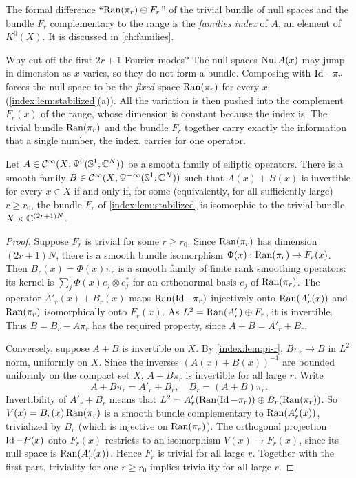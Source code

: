 The formal difference ``$\operatorname{Ran}(\pi_r)\ominus F_r$'' of the trivial bundle of
null spaces and the bundle $F_r$ complementary to the range is the
\emph{families index} of $A$, an element of $K^0(X)$. It is discussed in
\cref{ch:families}.

\begin{discussion}
  Why cut off the first $2r+1$ Fourier modes? The null spaces $\operatorname{Nul} A(x)$ may
  jump in dimension as $x$ varies, so they do not form a bundle. Composing with
  $\operatorname{Id}-\pi_r$ forces the null space to be the \emph{fixed} space $\operatorname{Ran}(\pi_r)$
  for every $x$ (\cref{index:lem:stabilized}(a)). All the variation is then
  pushed into the complement $F_r(x)$ of the range, whose dimension is constant
  because the index is. The trivial bundle $\operatorname{Ran}(\pi_r)$ and the bundle $F_r$
  together carry exactly the information that a single number, the index,
  carries for one operator.
\end{discussion}

\begin{theorem}\label{index:thm:perturb-family}
  Let $A\in\mathcal{C}^\infty(X;\Psi^{0}(\mathbb{S}^1;\mathbb{C}^N))$ be a smooth family of elliptic
  operators. There is a smooth family $B\in\mathcal{C}^\infty(X;\Psi^{-\infty}(\mathbb{S}^1;\mathbb{C}^N))$
  such that $A(x)+B(x)$ is invertible for every $x\in X$ if and only if, for
  some (equivalently, for all sufficiently large) $r\ge r_0$, the bundle
  $F_r$ of \cref{index:lem:stabilized} is isomorphic to the trivial bundle
  $X\times\mathbb{C}^{(2r+1)N}$.
\end{theorem}
\begin{proof}
  Suppose $F_r$ is trivial for some $r\ge r_0$. Since $\operatorname{Ran}(\pi_r)$ has
  dimension $(2r+1)N$, there is a smooth bundle isomorphism
  $\Phi(x):\operatorname{Ran}(\pi_r)\to F_r(x)$. Then $B_r(x)=\Phi(x)\pi_r$ is a smooth
  family of finite rank smoothing operators: its kernel is
  $\sum_j\Phi(x)e_j\otimes e_j^*$ for an orthonormal basis $e_j$ of
  $\operatorname{Ran}(\pi_r)$. The operator $A'_r(x)+B_r(x)$ maps $\operatorname{Ran}(\operatorname{Id}-\pi_r)$
  injectively onto $\operatorname{Ran}(A'_r(x))$ and $\operatorname{Ran}(\pi_r)$ isomorphically onto
  $F_r(x)$. As $L^2=\operatorname{Ran}(A'_r)\oplus F_r$, it is invertible. Thus
  $B=B_r-A\pi_r$ has the required property, since $A+B=A'_r+B_r$.

  Conversely, suppose $A+B$ is invertible on $X$. By \cref{index:lem:pi-r},
  $B\pi_r\to B$ in $L^2$ norm, uniformly on $X$. Since the inverses
  $(A(x)+B(x))^{-1}$ are bounded uniformly on the compact set $X$,
  $A+B\pi_r$ is invertible for all large $r$. Write
  \begin{equation*}
    A+B\pi_r=A'_r+B_r,\quad B_r=(A+B)\pi_r.
  \end{equation*}
  Invertibility of $A'_r+B_r$ means that
  $L^2=A'_r(\operatorname{Ran}(\operatorname{Id}-\pi_r))\oplus B_r(\operatorname{Ran}(\pi_r))$. So
  $V(x)=B_r(x)\operatorname{Ran}(\pi_r)$ is a smooth bundle complementary to
  $\operatorname{Ran}(A'_r(x))$, trivialized by $B_r$ (which is injective on
  $\operatorname{Ran}(\pi_r)$). The orthogonal projection $\operatorname{Id}-P(x)$ onto $F_r(x)$ restricts
  to an isomorphism $V(x)\to F_r(x)$, since its null space is $\operatorname{Ran}(A'_r(x))$.
  Hence $F_r$ is trivial for all large $r$. Together with the first part,
  triviality for one $r\ge r_0$ implies triviality for all large $r$.
\end{proof}

